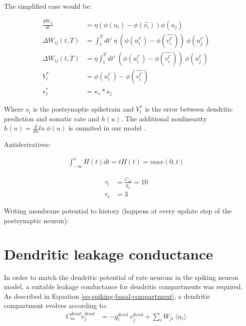 The simplified \citep{sacramento2018dendritic} case would be:

\begin{align}
  \frac{dW_{ij}}{dt} & = \eta (\phi(u_i) - \phi(\hat{v_i})) \phi(u_j)                                         \\
  \Delta W_{ij}(t,T) & = \int_t^T dt' \ \eta \  (\phi(u_i^{t'}) - \phi(\widehat{v_i^{t'}})) \  \phi(u_j^{t'}) \\
  \Delta W_{ij}(t,T) & = \eta \int_t^T dt' \  (\phi(u_i^{t'}) - \phi(\widehat{v_i^{t'}})) \ \phi(u_j^{t'})    \\
  V_i^*              & = \phi(u_i^{t'}) - \phi(\widehat{v_i^{t'}})                                            \\
  s_j^*              & = \kappa_s * s_j
\end{align}


Where $s_i$ is the postsynaptic spiketrain and $V_i^*$ is the error between dendritic prediction and somatic rate and
$h( u )$. The additional nonlinearity $h( u ) = \frac{d}{du} ln \  \phi(u)$ is ommited in our model .




Antiderivatives:

\begin{align}
  \int_{-\infty}^x H(t)dt = tH(t) = max(0,t)
\end{align}


\begin{align}
  \tau_l & = \frac{C_m}{g_L} = 10 \\
  \tau_s & = 3
\end{align}

Writing membrane potential to history (happens at every update step of the postsynaptic neuron):



\section{Dendritic leakage conductance}\label{sec-gl-dend}

In order to match the dendritic potential of rate neurons  in the spiking neuron model, a suitable leakage conductance
for dendritic compartments was required. As described in Equation \ref{eq-spiking-basal-compartment}, a dendritic
compartment evolves according to:
\begin{align}
  C_m^{dend} \dot{v}_j^{dend} & = -g_l^{dend} \  v_j^{dend} + \sum_i W_{ji} \    \langle \textit{n}_i \rangle
\end{align}


